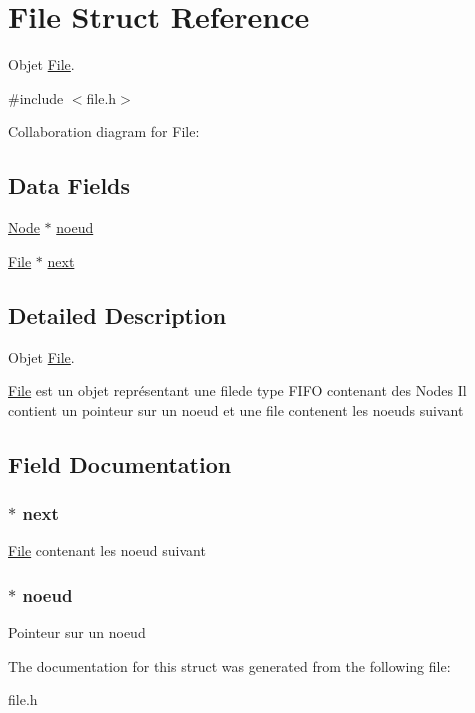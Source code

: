 \hypertarget{struct_file}{}\section{File Struct Reference}
\label{struct_file}


Objet \hyperlink{struct_file}{File}.  




{\ttfamily \#include $<$file.\+h$>$}



Collaboration diagram for File\+:
\subsection*{Data Fields}
\begin{DoxyCompactItemize}
\item 
\hyperlink{struct_node}{Node} $\ast$ \hyperlink{struct_file_ad454df4f99de9132ad2cbaced9990f00}{noeud}
\item 
\hyperlink{struct_file}{File} $\ast$ \hyperlink{struct_file_a307e0abd0e9e6e9139330399ba198c6b}{next}
\end{DoxyCompactItemize}


\subsection{Detailed Description}
Objet \hyperlink{struct_file}{File}. 

\hyperlink{struct_file}{File} est un objet représentant une filede type F\+I\+F\+O contenant des Nodes Il contient un pointeur sur un noeud et une file contenent les noeuds suivant 

\subsection{Field Documentation}
\hypertarget{struct_file_a307e0abd0e9e6e9139330399ba198c6b}{}
\subsubsection[{next}]{$\ast$ next}\label{struct_file_a307e0abd0e9e6e9139330399ba198c6b}
\hyperlink{struct_file}{File} contenant les noeud suivant \hypertarget{struct_file_ad454df4f99de9132ad2cbaced9990f00}{}
\subsubsection[{noeud}]{$\ast$ noeud}\label{struct_file_ad454df4f99de9132ad2cbaced9990f00}
Pointeur sur un noeud 

The documentation for this struct was generated from the following file\+:\begin{DoxyCompactItemize}
\item 
file.\+h\end{DoxyCompactItemize}
